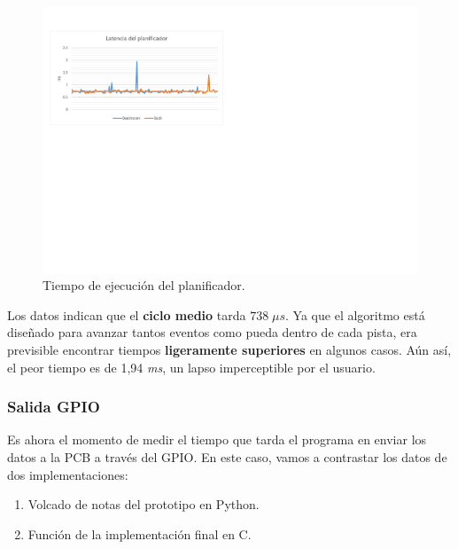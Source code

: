 \smallskip

\begin{figure}[H]
	\noindent \begin{centering}
		\includegraphics[width=\linewidth*3/4]{capitulo6/lat_sched}
		\par\end{centering}
	\smallskip
	\caption{\label{fig:lat_sched} Tiempo de ejecución del planificador.}
\end{figure} 

\smallskip

Los datos indican que el \textbf{ciclo medio} tarda $738 \; \mu s$. Ya que el algoritmo está diseñado para avanzar tantos eventos como pueda dentro de cada pista, era previsible encontrar tiempos \textbf{ligeramente superiores} en algunos casos. Aún así, el peor tiempo es de 1,94 \textit{ms}, un lapso imperceptible por el usuario.

\subsubsection{Salida GPIO}

Es ahora el momento de medir el tiempo que tarda el programa en enviar los datos a la \acrshort{PCB} a través del \acrshort{GPIO}. En este caso, vamos a contrastar los datos de dos implementaciones:

\begin{enumerate}
	\item Volcado de notas del prototipo en Python.
	\item Función  de la implementación final en C.
\end{enumerate}

